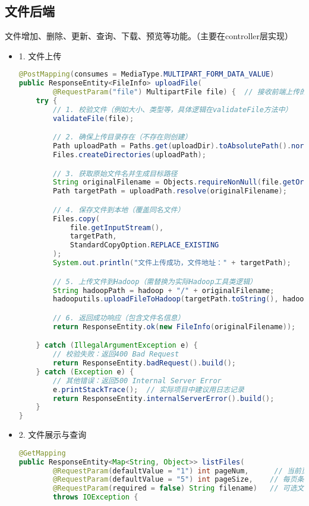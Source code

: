 \documentclass[bachelor]{thesis-uestc}
\begin{document}
\subsection{文件后端}
文件增加、删除、更新、查询、下载、预览等功能。（主要在controller层实现）
\begin{itemize}

\item 1. 文件上传
\begin{lstlisting}[language=Java]
@PostMapping(consumes = MediaType.MULTIPART_FORM_DATA_VALUE)
public ResponseEntity<FileInfo> uploadFile(
        @RequestParam("file") MultipartFile file) {  // 接收前端上传的Multipart文件
    try {
        // 1. 校验文件（例如大小、类型等，具体逻辑在validateFile方法中）
        validateFile(file);

        // 2. 确保上传目录存在（不存在则创建）
        Path uploadPath = Paths.get(uploadDir).toAbsolutePath().normalize();
        Files.createDirectories(uploadPath);

        // 3. 获取原始文件名并生成目标路径
        String originalFilename = Objects.requireNonNull(file.getOriginalFilename());
        Path targetPath = uploadPath.resolve(originalFilename);

        // 4. 保存文件到本地（覆盖同名文件）
        Files.copy(
            file.getInputStream(), 
            targetPath, 
            StandardCopyOption.REPLACE_EXISTING
        );
        System.out.println("文件上传成功，文件地址：" + targetPath);

        // 5. 上传文件到Hadoop（需替换为实际Hadoop工具类逻辑）
        String hadoopPath = hadoop + "/" + originalFilename;
        hadooputils.uploadFileToHadoop(targetPath.toString(), hadoopPath);

        // 6. 返回成功响应（包含文件名信息）
        return ResponseEntity.ok(new FileInfo(originalFilename));

    } catch (IllegalArgumentException e) {
        // 校验失败：返回400 Bad Request
        return ResponseEntity.badRequest().build();
    } catch (Exception e) {
        // 其他错误：返回500 Internal Server Error
        e.printStackTrace();  // 实际项目中建议用日志记录
        return ResponseEntity.internalServerError().build();
    }
}
\end{lstlisting}
\item 2. 文件展示与查询
\begin{lstlisting}[language=Java]
   @GetMapping
public ResponseEntity<Map<String, Object>> listFiles(
        @RequestParam(defaultValue = "1") int pageNum,      // 当前页码，默认为1
        @RequestParam(defaultValue = "5") int pageSize,    // 每页条数，默认为5
        @RequestParam(required = false) String filename)   // 可选文件名过滤条件
        throws IOException {
    

\end{lstlisting}
\end{itemize}
\end{document}
